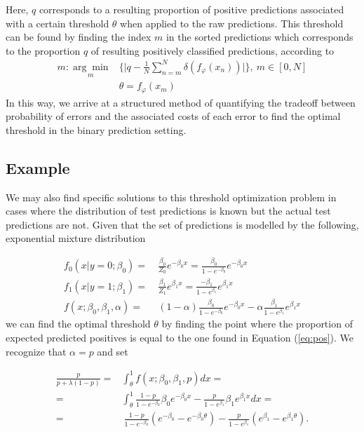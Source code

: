 \documentclass{article}
\begin{document}
Here, $q$ corresponds to a resulting proportion of positive predictions associated with a certain threshold $\theta$ when applied to the raw predictions. This threshold can be found by finding the index $m$ in the sorted predictions which corresponds to the proportion $q$ of resulting positively classified predictions, according to
\begin{align}
\label{eq:m}
m : \underset{m}{\arg \min}&\Big\{ \Big \lvert q - \frac{1}{N}\sum_{n=m}^N\delta(f_\varphi(x_n)) \Big \rvert \Big\}, \ m \in [0, N] \\
&\theta = f_\varphi(x_m)
\end{align}
In this way, we arrive at a structured method of quantifying the tradeoff between probability of errors and the associated costs of each error to find the optimal threshold in the binary prediction setting.


\subsection{Example}

We may also find specific solutions to this threshold optimization problem in cases where the distribution of test predictions is known but the actual test predictions are not.
Given that the set of predictions is modelled by the following, exponential mixture distribution

\begin{align*}
    f_0(x\vert y=0;\beta_0) =& \ \frac{\beta_0}{Z_0}e^{-\beta_0 x} = \frac{\beta_0}{1-e^{-\beta_0}}e^{-\beta_0 x} \\
    f_1(x\vert y=1;\beta_1) =& \ \frac{\beta_1}{Z_1}e^{\beta_1 x} = \frac{-\beta_1}{1-e^{\beta_1}}e^{\beta_1 x}\\
    f (x;\beta_0,\beta_1,\alpha) =& \ (1-\alpha)\frac{\beta_0}{1-e^{-\beta_0}}e^{-\beta_0 x} - \alpha\frac{\beta_1}{1-e^{\beta_1}}e^{\beta_1 x} %
\end{align*}
we can find the optimal threshold $\theta$ by finding the point where the proportion of expected predicted positives is equal to the one found in Equation (\ref{eq:pos}). We recognize that $\alpha = p$ and set

\begin{align}
    \frac{p}{p+\lambda(1-p)} = & \int_{\theta}^1 f(x;\beta_0, \beta_1, p) dx = \\
    = & \int_{\theta}^1 \frac{1-p}{1-e^{-\beta_0}}\beta_0e^{-\beta_0x} - \frac{p}{1-e^{\beta_1}}\beta_1e^{\beta_1x} dx = \\
    = & \ \frac{1-p}{1-e^{-\beta_0}}(e^{-\beta_0}-e^{-\beta_0 \theta}) - \frac{p}{1-e^{\beta_1}}(e^{\beta_1}-e^{\beta_1 \theta})\text{.}
\end{align}
\end{document}
